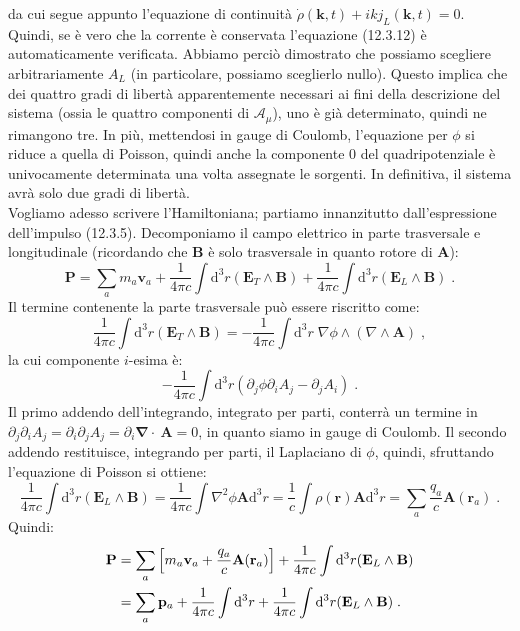 \documentclass[12pt,a4paper]{report}
\theoremstyle{definition}
\numberwithin{equation}{section}
\newcommand{\diff}[1][]{\mathrm{d}#1}
\newcommand{\bnabla}{\boldsymbol{\nabla}}
\begin{document}
da cui segue appunto l'equazione di continuità $\dot{\rho}(\mathbf{k},t)+ikj_L(\mathbf{k},t)=0$. Quindi, se è vero che la corrente è conservata l'equazione (12.3.12) è automaticamente verificata. Abbiamo perciò dimostrato che possiamo scegliere arbitrariamente $A_L$ (in particolare, possiamo sceglierlo nullo). Questo implica che dei quattro gradi di libertà apparentemente necessari ai fini della descrizione del sistema (ossia le quattro componenti di $\mathcal{A}_{\mu}$), uno è già determinato, quindi ne rimangono tre. In più, mettendosi in gauge di Coulomb, l'equazione per $\phi$ si riduce a quella di Poisson, quindi anche la componente 0 del quadripotenziale è univocamente determinata una volta assegnate le sorgenti. In definitiva, il sistema avrà solo due gradi di libertà. \\
Vogliamo adesso scrivere l'Hamiltoniana; partiamo innanzitutto dall'espressione dell'impulso (12.3.5). Decomponiamo il campo elettrico in parte trasversale e longitudinale (ricordando che $\mathbf{B}$ è solo trasversale in quanto rotore di $\mathbf{A}$):
\begin{equation}
\mathbf{P}=\sum_a m_a\mathbf{v}_a+\frac{1}{4\pi c}\int\diff^3{r}(\mathbf{E}_T\wedge\mathbf{B})+\frac{1}{4\pi c}\int\diff^3{r}(\mathbf{E}_L\wedge\mathbf{B})\;.
\end{equation}
Il termine contenente la parte trasversale può essere riscritto come:
\begin{equation}
\frac{1}{4\pi c}\int\diff^3{r}(\mathbf{E}_T\wedge\mathbf{B})=-\frac{1}{4\pi c}\int\diff^3{r}\;\nabla\phi\wedge(\nabla\wedge\mathbf{A})\;,
\end{equation}
la cui componente $i$-esima è:
\begin{equation}
-\frac{1}{4\pi c}\int\diff^3{r}(\partial_j\phi\partial_iA_j-\partial_jA_i)\;.
\end{equation}
Il primo addendo dell'integrando, integrato per parti, conterrà un termine in $\partial_j\partial_iA_j=\partial_i\partial_jA_j=\partial_i\bnabla\cdot~\mathbf{A}=0$, in quanto siamo in gauge di Coulomb. Il secondo addendo restituisce, integrando per parti, il Laplaciano di $\phi$, quindi, sfruttando l'equazione di Poisson si ottiene:
\begin{equation}
\frac{1}{4\pi c}\int\diff^3{r}(\mathbf{E}_L\wedge\mathbf{B})=\frac{1}{4\pi c}\int \nabla^2\phi\mathbf{A}\diff^3{r}=\frac{1}{c}\int\rho(\mathbf{r})\mathbf{A}\diff^3{r}=\sum_a \frac{q_a}{c}\mathbf{A}(\mathbf{r}_a)\;.
\end{equation}
Quindi:
\begin{align}
\mathbf{P} &= \sum_a\left[m_a\mathbf{v}_a+\frac{q_a}{c}\mathbf{A}(\mathbf{r}_a)\right]+\frac{1}{4\pi c}\int\diff^3{r}(\mathbf{E}_L\wedge\mathbf{B}) \notag \\
&= \sum_a \mathbf{p}_a+\frac{1}{4\pi c}\int\diff^3{r}+\frac{1}{4\pi c}\int\diff^3{r}(\mathbf{E}_L\wedge\mathbf{B})\;.
\end{align}
\end{document}
